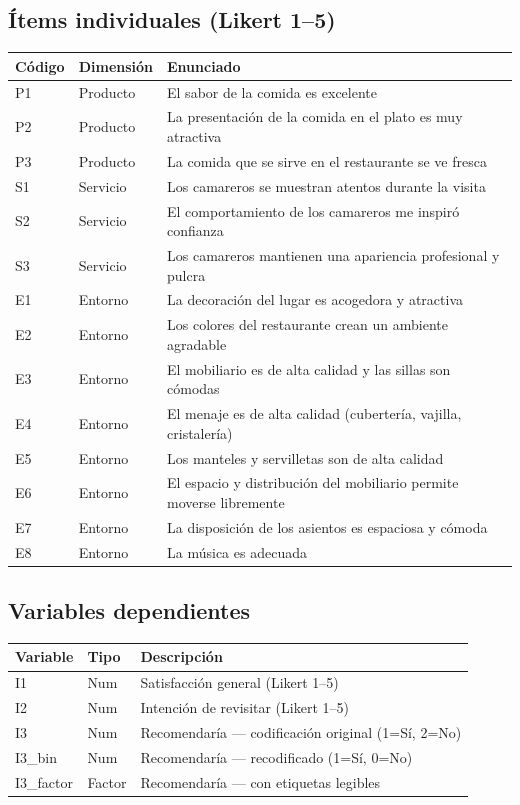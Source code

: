 \documentclass[
  spanish,
]{article}
\begin{document}
\subsection{Ítems individuales (Likert
1--5)}\label{uxedtems-individuales-likert-15}

\begin{longtabu} to 
\toprule
Código & Dimensión & Enunciado\\
\midrule
P1 & Producto & El sabor de la comida es excelente\\
P2 & Producto & La presentación de la comida en el plato es muy atractiva\\
P3 & Producto & La comida que se sirve en el restaurante se ve fresca\\
S1 & Servicio & Los camareros se muestran atentos durante la visita\\
S2 & Servicio & El comportamiento de los camareros me inspiró confianza\\
\addlinespace
S3 & Servicio & Los camareros mantienen una apariencia profesional y pulcra\\
E1 & Entorno & La decoración del lugar es acogedora y atractiva\\
E2 & Entorno & Los colores del restaurante crean un ambiente agradable\\
E3 & Entorno & El mobiliario es de alta calidad y las sillas son cómodas\\
E4 & Entorno & El menaje es de alta calidad (cubertería, vajilla, cristalería)\\
\addlinespace
E5 & Entorno & Los manteles y servilletas son de alta calidad\\
E6 & Entorno & El espacio y distribución del mobiliario permite moverse libremente\\
E7 & Entorno & La disposición de los asientos es espaciosa y cómoda\\
E8 & Entorno & La música es adecuada\\
\bottomrule
\end{longtabu}

\subsection{Variables dependientes}\label{variables-dependientes}

\begin{longtable}[t]{lll}
\toprule
Variable & Tipo & Descripción\\
\midrule
I1 & Num & Satisfacción general (Likert 1–5)\\
I2 & Num & Intención de revisitar (Likert 1–5)\\
I3 & Num & Recomendaría — codificación original (1=Sí, 2=No)\\
I3\_bin & Num & Recomendaría — recodificado (1=Sí, 0=No)\\
I3\_factor & Factor & Recomendaría — con etiquetas legibles\\
\bottomrule
\end{longtable}
\end{document}
